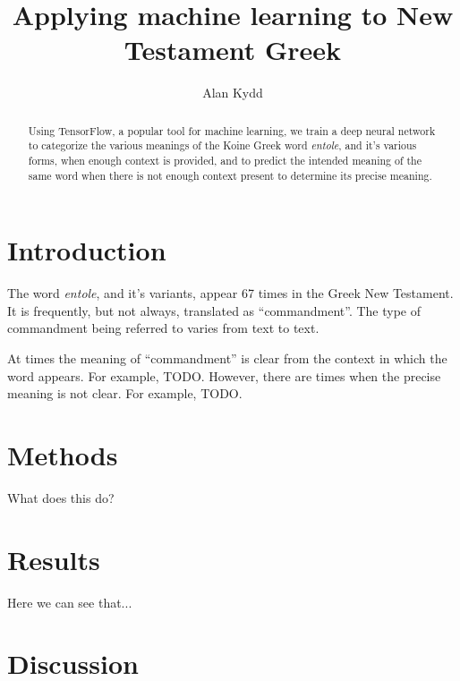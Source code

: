 \documentclass{article}
\title{Applying machine learning to New Testament Greek}
\author{Alan Kydd}
\begin{document}
\maketitle

\begin{abstract}
Using TensorFlow, a popular tool for machine learning, we train a deep neural
network to categorize the various meanings of the Koine Greek word \textit{entole},
        and it's various forms,
when enough context is provided, and to predict the intended meaning of the same
word when there is not enough context present to determine its precise meaning.
\end{abstract}

\section{Introduction}
The word \textit{entole}, and it's variants, appear 67 times in the Greek New 
Testament. It is frequently, but not always, translated as
``commandment''. The type of commandment being referred to varies from text to 
text.

At times the meaning of ``commandment'' is clear from the context in which
the word appears.  For example, TODO.  However, there are times when the precise
meaning is not clear.  For example, TODO.  

\section{Methods}
What does this do?

\section{Results}
Here we can see that...

\section{Discussion}
\end{document}
